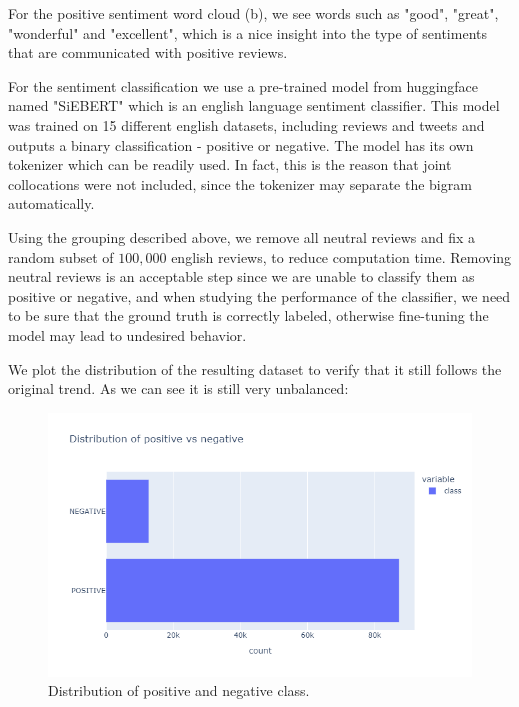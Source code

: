 \documentclass[a4paper,10pt, openright]{article}
\begin{document}
For the positive sentiment word cloud (b), we see words such as "good", "great", "wonderful" and "excellent", which is a nice insight into the type of sentiments that are communicated with positive reviews. 

For the sentiment classification we use a pre-trained model from huggingface named "SiEBERT"\cite{fourthbib} which is an english language sentiment classifier. This model was trained on 15 different english datasets, including reviews and tweets and outputs a binary classification - positive or negative. The model has its own tokenizer which can be readily used. In fact, this is the reason that joint collocations were not included, since the tokenizer may separate the bigram automatically. 

Using the grouping described above, we remove all neutral reviews and fix a random subset of $100,000$ english reviews, to reduce computation time. Removing neutral reviews is an acceptable step since we are unable to classify them as positive or negative, and when studying the performance of the classifier, we need to be sure that the ground truth is correctly labeled, otherwise fine-tuning the model may lead to undesired behavior. 

We plot the distribution of the resulting dataset to verify that it still follows the original trend. As we can see it is still very unbalanced:


\begin{figure}[H]
	\begin{center}
		\includegraphics[width=18 cm, height=9 cm]{./Images/posvsneg.png}
		\caption{Distribution of positive and negative class.}
		\label{fig:posvsneg}
	\end{center}
\end{figure}
\end{document}
